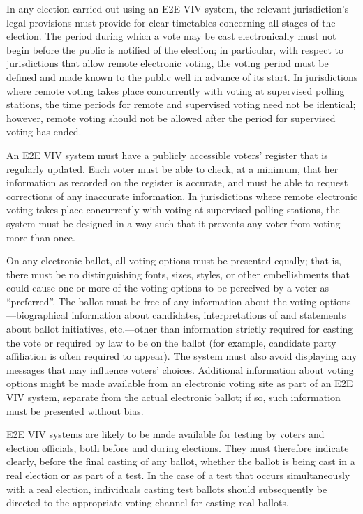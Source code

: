 In any election carried out using an E2E VIV system, the relevant
jurisdiction's legal provisions must provide for clear timetables
concerning all stages of the election. The period during which a vote
may be cast electronically must not begin before the public is
notified of the election; in particular, with respect to jurisdictions
that allow remote electronic voting, the voting period must be defined
and made known to the public well in advance of its start. In
jurisdictions where remote voting takes place concurrently with voting
at supervised polling stations, the time periods for remote and
supervised voting need not be identical; however, remote voting should
not be allowed after the period for supervised voting has ended.

An E2E VIV system must have a publicly accessible voters' register
that is regularly updated. Each voter must be able to check, at a
minimum, that her information as recorded on the register is accurate,
and must be able to request corrections of any inaccurate
information. In jurisdictions where remote electronic voting takes
place concurrently with voting at supervised polling stations, the
system must be designed in a way such that it prevents any voter from
voting more than once.

On any electronic ballot, all voting options must be presented
equally; that is, there must be no distinguishing fonts, sizes,
styles, or other embellishments that could cause one or more of the
voting options to be perceived by a voter as ``preferred''. The ballot
must be free of any information about the voting
options---biographical information about candidates, interpretations
of and statements about ballot initiatives, etc.---other than
information strictly required for casting the vote or required by law
to be on the ballot (for example, candidate party affiliation is often
required to appear). The system must also avoid displaying any
messages that may influence voters' choices. Additional information
about voting options might be made available from an electronic voting
site as part of an E2E VIV system, separate from the actual electronic
ballot; if so, such information must be presented without bias.

E2E VIV systems are likely to be made available for testing by voters
and election officials, both before and during elections. They must
therefore indicate clearly, before the final casting of any ballot,
whether the ballot is being cast in a real election or as part of a
test. In the case of a test that occurs simultaneously with a real
election, individuals casting test ballots should subsequently be
directed to the appropriate voting channel for casting real ballots.

